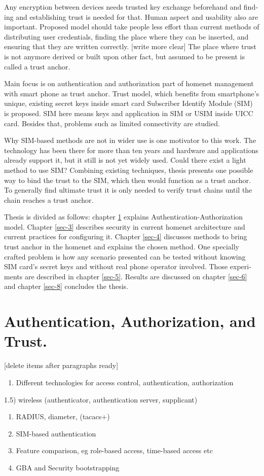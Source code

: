 \documentclass[12pt,a4paper,english]{tutthesis}
\begin{document}
\begin{otherlanguage}{english}
Any encryption between devices needs trusted key exchange
beforehand and finding and establishing trust is needed for that.
Human aspect and usability also are important. Proposed model should
take people less effort than current methods of distributing user
credentials, finding the place where they can be inserted, and
ensuring that they are written correctly. [write more clear]
The place where trust is not anymore derived or built upon other 
fact, but assumed to be present is called a trust anchor.

Main focus is on authentication and authorization part of
homenet management with smart phone as trust anchor.
Trust model, which benefits from smartphone's unique,
existing secret keys inside smart card Subscriber Identify Module
(SIM) is proposed. 
SIM here means keys and application in SIM or USIM inside UICC card. 
Besides that, problems such as limited connectivity are studied. 


Why SIM-based methods are not in wider use is one motivator to this
work.  The technology has been there for more than ten years and
hardware and applications already support it, but it still is not yet
widely used.  Could there exist a light method to use SIM?  Combining
existing techniques, thesis presents one possible way to bind the
trust to the SIM, which then would function as a trust anchor. To
generally find ultimate trust it is only needed to verify trust chains
until the chain reaches a trust anchor.




Thesis is divided as follows: chapter \ref{sec-2} explains Authentication-Authorization model.
Chapter \ref{sec-3} describes security in current homenet architecture and 
current practices for configuring it.
 Chapter \ref{sec-4}
discusses methods to bring trust anchor in the homenet and explains
the chosen method.
One specially crafted problem is how any scenario presented can be
tested without knowing SIM card's secret keys and without real phone
operator involved.  Those experiments are described in chapter
\ref{sec-5}.
Results are discussed on chapter  \ref{sec-6} and chapter \ref{sec-8} concludes the
thesis.
\chapter{Authentication, Authorization, and Trust.}
\label{sec-2}

[delete items after paragraphs ready]
\begin{enumerate}
\item Different technologies for access control, authentication,
authorization
\end{enumerate}
1.5) wireless (authenticator, authentication server, supplicant)
\begin{enumerate}
\item RADIUS, diameter, (tacacs+)
\item SIM-based authentication
\item Feature comparison, eg role-based access, time-based access etc
\item GBA and Security bootstrapping
\end{enumerate}


\end{otherlanguage}
\end{document}
